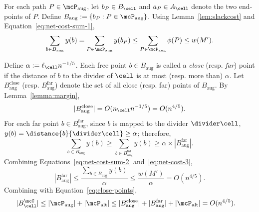 For each path $P\in \mcP_{\mathrm{aug}}$, let $b_P\in B_\cell$ and $a_P\in A_\cell$ denote the two end-points of $P$. Define $B_{\mathrm{aug}}:=\{b_P:P\in \mcP_{\mathrm{aug}}\}$.  Using Lemma~\ref{lem:slackcost} and Equation~\eqref{eq:net-cost-sum-1}, 
\begin{align}
    \sum_{b\in B_{\mathrm{aug}}} y(b) = \sum_{P\in \mcP_{\mathrm{aug}}} y(b_P)\le \sum_{P\in \mcP_{\mathrm{aug}}} \phi(P) \le w(M') .\label{eq:net-cost-sum-2}
\end{align}

Define $\alpha:=\ell_\cell n^{-1/5}$. Each free point $b\in B_{\mathrm{aug}}$ is called a \emph{close} (resp. \emph{far}) point if the distance of $b$ to the divider of $\cell$ is at most (resp. more than) $\alpha$. Let $B_{\mathrm{aug}}^{\mathrm{close}}$ (resp. $B_{\mathrm{aug}}^{\mathrm{far}}$) denote the set of all close (resp. far) points of $B_{\mathrm{aug}}$. By Lemma~\ref{lemma:margin},
\begin{equation}\label{eq:close-points}
    |B_{\mathrm{aug}}^{\mathrm{close}}| = O(n_\cell n^{-1/5}) = O(n^{4/5}).
\end{equation}
For each far point $b\in B_{\mathrm{aug}}^{\mathrm{far}}$, since $b$ is mapped to the divider $\divider\cell$, $y(b)=\distance{b}{\divider\cell}\ge \alpha$; therefore, 
\begin{equation}\label{eq:net-cost-3}
    \sum_{b\in B_{\mathrm{aug}}} y(b) \ge \sum_{b\in B_{\mathrm{aug}}^{\mathrm{far}}} y(b) \ge \alpha\times |B_{\mathrm{aug}}^{\mathrm{far}}|.
\end{equation}
Combining Equations~\eqref{eq:net-cost-sum-2} and~\eqref{eq:net-cost-3},
\begin{equation}\label{eq:far-points}
    |B_{\mathrm{aug}}^{\mathrm{far}}| \le \frac{\sum_{b\in B_{\mathrm{aug}}} y(b)}{\alpha} \le \frac{w(M')}{\alpha} = O(n^{4/5}).
\end{equation}
Combining with Equation~\eqref{eq:close-points},
\begin{align*}
    |B_\cell^\mcC| &\le |\mcP_{\mathrm{aug}}| + |\mcP_{\mathrm{alt}}| \le |B_{\mathrm{aug}}^{\mathrm{close}}| + |B_{\mathrm{aug}}^{\mathrm{far}}| + |\mcP_{\mathrm{alt}}| = O(n^{4/5}).
\end{align*}




